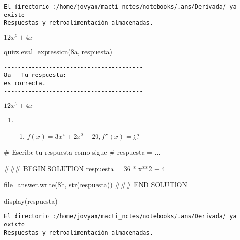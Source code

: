 \documentclass[
  letterpaper,
  DIV=11,
  numbers=noendperiod]{scrreprt}
\newenvironment{Shaded}{\begin{snugshade}}{\end{snugshade}}
\newcommand{\BuiltInTok}[1]{\textcolor[rgb]{0.00,0.23,0.31}{#1}}
\newcommand{\CommentTok}[1]{\textcolor[rgb]{0.37,0.37,0.37}{#1}}
\newcommand{\DecValTok}[1]{\textcolor[rgb]{0.68,0.00,0.00}{#1}}
\newcommand{\NormalTok}[1]{\textcolor[rgb]{0.00,0.23,0.31}{#1}}
\newcommand{\OperatorTok}[1]{\textcolor[rgb]{0.37,0.37,0.37}{#1}}
\newcommand{\RegionMarkerTok}[1]{\textcolor[rgb]{0.00,0.23,0.31}{#1}}
\newcommand{\StringTok}[1]{\textcolor[rgb]{0.13,0.47,0.30}{#1}}
\providecommand{\tightlist}{%
  \setlength{\itemsep}{0pt}\setlength{\parskip}{0pt}}\usepackage{longtable,booktabs,array}
\begin{document}
\begin{verbatim}
El directorio :/home/jovyan/macti_notes/notebooks/.ans/Derivada/ ya existe
Respuestas y retroalimentación almacenadas.
\end{verbatim}

$\displaystyle 12 x^{3} + 4 x$

\begin{Shaded}
\begin{Highlighting}[]
\NormalTok{quizz.eval\_expression(}\StringTok{\textquotesingle{}8a\textquotesingle{}}\NormalTok{, respuesta)}
\end{Highlighting}
\end{Shaded}

\begin{verbatim}
----------------------------------------
8a | Tu respuesta:
es correcta.
----------------------------------------
\end{verbatim}

$\displaystyle 12 x^{3} + 4 x$

\begin{enumerate}
\def\labelenumi{\arabic{enumi}.}
\setcounter{enumi}{7}
\tightlist
\item
  \begin{enumerate}
  \def\labelenumii{\alph{enumii}.}
  \setcounter{enumii}{1}
  \tightlist
  \item
    \(f(x) = 3x^4 + 2x^2 - 20, f''(x) = ¿?\)
  \end{enumerate}
\end{enumerate}

\begin{Shaded}
\begin{Highlighting}[]
\CommentTok{\# Escribe tu respuesta como sigue }
\CommentTok{\# respuesta = ...}

\CommentTok{\#\#\# }\RegionMarkerTok{BEGIN}\CommentTok{ SOLUTION}
\NormalTok{respuesta }\OperatorTok{=} \DecValTok{36} \OperatorTok{*}\NormalTok{ x}\OperatorTok{**}\DecValTok{2} \OperatorTok{+} \DecValTok{4}

\NormalTok{file\_answer.write(}\StringTok{\textquotesingle{}8b\textquotesingle{}}\NormalTok{, }\BuiltInTok{str}\NormalTok{(respuesta))}
\CommentTok{\#\#\# }\RegionMarkerTok{END}\CommentTok{ SOLUTION}

\NormalTok{display(respuesta)}
\end{Highlighting}
\end{Shaded}

\begin{verbatim}
El directorio :/home/jovyan/macti_notes/notebooks/.ans/Derivada/ ya existe
Respuestas y retroalimentación almacenadas.
\end{verbatim}
\end{document}

